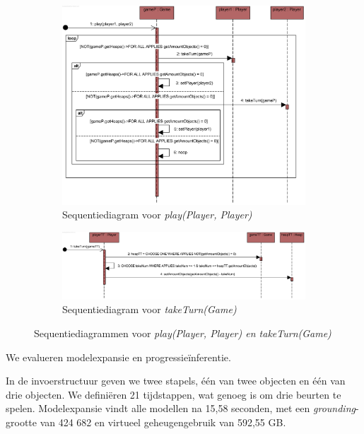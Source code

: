 \begin{figure}
	\centering
	\begin{subfigure}{\textwidth}
		\includegraphics[width=\textwidth]{chap-declaratieve-seq/play.png}
		\caption{Sequentiediagram voor \textit{play(Player, Player)}}
		\label{fig:nim-assoc-play}
	\end{subfigure}
	\begin{subfigure}{\textwidth}
		\includegraphics[width=\textwidth]{chap-declaratieve-seq/takeTurn.png}
		\caption{Sequentiediagram voor \textit{takeTurn(Game)}}
		\label{fig:nim-assoc-taketurn}
	\end{subfigure}
	\caption{Sequentiediagrammen voor \textit{play(Player, Player) en \textit{takeTurn(Game)}}}
	\label{fig:nim-assoc-seq}
\end{figure}

We evalueren modelexpansie en progressie\"inferentie.

In de invoerstructuur geven we twee stapels, \'e\'en van twee objecten en \'e\'en van drie objecten. We defini\"eren 21 tijdstappen, wat genoeg is om drie beurten te spelen. Modelexpansie vindt alle modellen na 15,58 seconden, met een \textit{grounding}-grootte van 424 682 en virtueel geheugengebruik van 592,55 GB.

